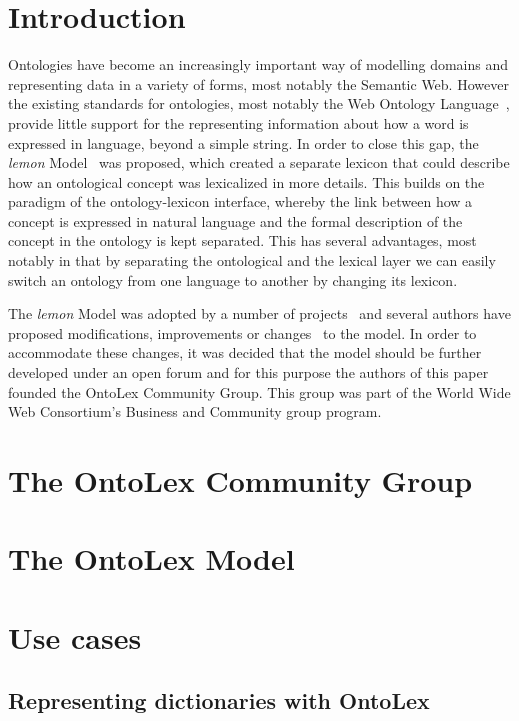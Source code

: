 \documentclass[12pt,a4paper]{elex2017}
\begin{document}
\section{Introduction}

Ontologies have become an increasingly important way of modelling domains and
representing data in a variety of forms, most notably the Semantic Web. However
the existing standards for ontologies, most notably the Web Ontology
Language~\cite[OWL]{mcguinness2004ow}, provide little support for the
representing information about how a word is expressed in language, beyond a
simple string. In order to close this gap, the \emph{lemon}
Model~\cite{mccrae2012interchanging} was proposed, which created a separate
lexicon that could describe how an ontological concept was lexicalized in more
details. This builds on the paradigm of the ontology-lexicon interface, whereby
the link between how a concept is expressed in natural language and the formal
description of the concept in the ontology is kept separated. This has several
advantages, most notably in that by separating the ontological and the lexical
layer we can easily switch an ontology from one language to another by changing
its lexicon. 

The \emph{lemon} Model was adopted by a number of projects~\cite{todo} and
several authors have proposed modifications, improvements or changes~\cite{todo}
to the model. In order to accommodate these changes, it was decided that the
model should be further developed under an open forum and for this purpose the
authors of this paper founded the OntoLex Community Group. This group was part
of the World Wide Web Consortium's Business and Community group program.

\section{The OntoLex Community Group}

\section{The OntoLex Model}

\section{Use cases}

\subsection{Representing dictionaries with OntoLex}
\end{document}
